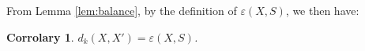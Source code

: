 \documentclass{article}
\newtheorem{corrolary}[thm]{Corrolary}
\DeclareMathOperator{\support}{support}
\begin{document}
From Lemma \ref{lem:balance}, by the definition of $\varepsilon(X,S)$, we then have:

\begin{corrolary} \label{col:Xprime}
	$d_k(X,X') = \varepsilon(X,S)$.
\end{corrolary}

%	
%	
%	
%	
%	
%	
%	
\end{document}
